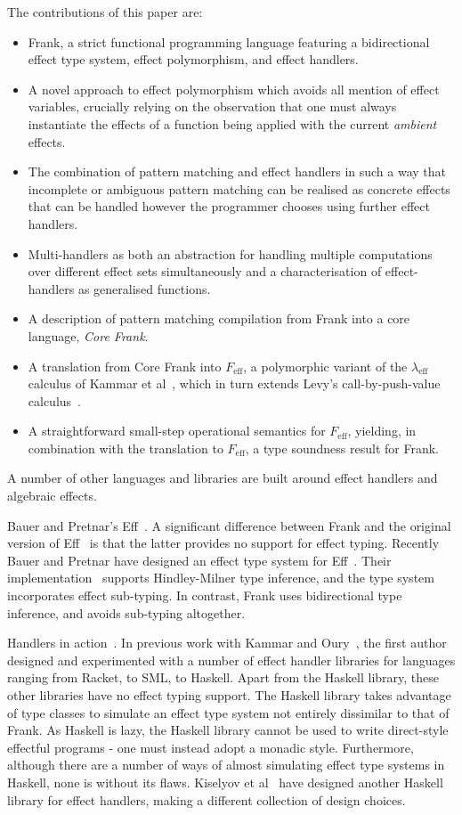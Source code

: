 \documentclass[preprint]{sigplanconf}
\newcommand{\lameff}{$\lambda_\mathrm{eff}$\xspace}
\newcommand{\feff}{$F_\textrm{eff}$\xspace}
\begin{document}
The contributions of this paper are:
\begin{itemize}
\item Frank, a strict functional programming language featuring a
  bidirectional effect type system, effect polymorphism, and effect
  handlers.
\item A novel approach to effect polymorphism which avoids all mention
  of effect variables, crucially relying on the observation that one
  must always instantiate the effects of a function being applied with
  the current \emph{ambient} effects.
\item The combination of pattern matching and effect handlers in such
  a way that incomplete or ambiguous pattern matching can be realised
  as concrete effects that can be handled however the programmer
  chooses using further effect handlers.
\item Multi-handlers as both an abstraction for handling multiple
  computations over different effect sets simultaneously and a
  characterisation of effect-handlers as generalised functions.
\item A description of pattern matching compilation from Frank into a
  core language, \emph{Core Frank}.
\item A translation from Core Frank into \feff, a polymorphic variant
  of the \lameff calculus of Kammar et al~\cite{KammarLO13}, which in
  turn extends Levy's call-by-push-value calculus~\cite{Levy2004}.
\item A straightforward small-step operational semantics for \feff,
  yielding, in combination with the translation to \feff, a type
  soundness result for Frank.
\end{itemize}

A number of other languages and libraries are built around effect
handlers and algebraic effects.

Bauer and Pretnar's Eff~\cite{BauerP12}. A significant difference
between Frank and the original version of Eff~\cite{BauerP12} is that
the latter provides no support for effect typing. Recently Bauer and
Pretnar have designed an effect type system for
Eff~\cite{BauerP13}. Their implementation~\cite{Pretnar13} supports
Hindley-Milner type inference, and the type system incorporates effect
sub-typing. In contrast, Frank uses bidirectional type inference, and
avoids sub-typing altogether.

Handlers in action~\cite{KammarLO13}. In previous work with Kammar and
Oury~\cite{KammarLO13}, the first author designed and experimented
with a number of effect handler libraries for languages ranging from
Racket, to SML, to Haskell. Apart from the Haskell library, these
other libraries have no effect typing support. The Haskell library
takes advantage of type classes to simulate an effect type system not
entirely dissimilar to that of Frank. As Haskell is lazy, the Haskell
library cannot be used to write direct-style effectful programs - one
must instead adopt a monadic style. Furthermore, although there are a
number of ways of almost simulating effect type systems in Haskell,
none is without its flaws. Kiselyov et al~\cite{KiselyovSS13} have
designed another Haskell library for effect handlers, making a
different collection of design choices.
\end{document}
